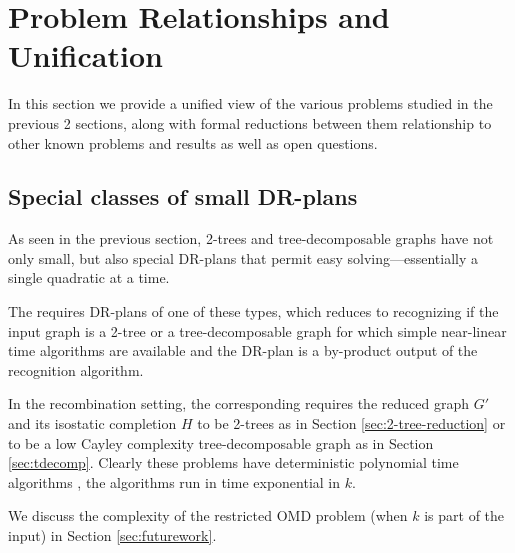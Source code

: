 \section{Problem Relationships and Unification}
\label{sec:table}

In this section we provide a unified view of the various problems studied in the previous 2 sections, along with formal reductions between them relationship to other known problems and results as well as open questions.





\subsection{Special classes of small DR-plans}
As seen in the previous section, 2-trees and tree-decomposable graphs have not only small, but also special DR-plans that permit easy solving---essentially a single quadratic at a time.

The  requires DR-plans of one of these types, which reduces to recognizing if the input graph is a 2-tree or a tree-decomposable graph for which simple near-linear time algorithms are available \cite{valdes1979recognition,fudos1997graph} and the DR-plan is a by-product output of the recognition algorithm.

In the recombination setting, the corresponding  requires the reduced graph $G'$ and its isostatic completion $H$ to be 2-trees as in Section \ref{sec:2-tree-reduction} or to be a low Cayley complexity tree-decomposable graph as in Section \ref{sec:tdecomp}. Clearly these problems have deterministic polynomial time algorithms ,  the algorithms run in time exponential in $k$.

We discuss the complexity of the restricted OMD problem (when $k$ is part of the input) in Section \ref{sec:futurework}.

